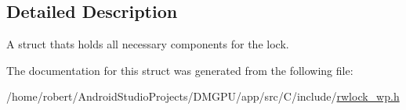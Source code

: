 \subsection{Detailed Description}
A struct thats holds all necessary components for the lock. 

The documentation for this struct was generated from the following file\+:\begin{DoxyCompactItemize}
\item 
/home/robert/\+Android\+Studio\+Projects/\+D\+M\+G\+P\+U/app/src/\+C/include/\mbox{\hyperlink{rwlock__wp_8h}{rwlock\+\_\+wp.\+h}}\end{DoxyCompactItemize}
